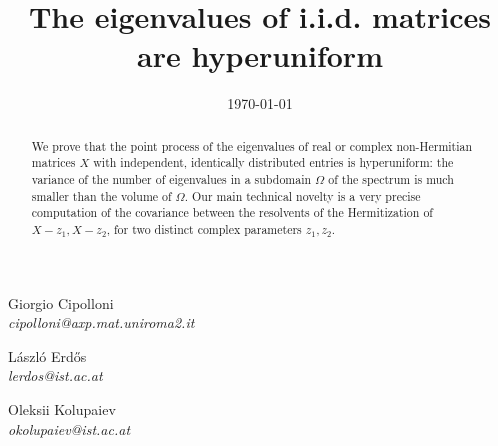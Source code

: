 \documentclass[10pt]{amsart}
\title[Hyperuniformity]{The eigenvalues of i.i.d. matrices are hyperuniform}
\date{\today}
\numberwithin{equation}{section}
\begin{document}
\maketitle

\vspace{0.25cm}

\renewcommand{\thefootnote}{\fnsymbol{footnote}}	


\noindent
\mbox{}%
\hfill%
\begin{minipage}{0.19\textwidth}
	\centering
	{Giorgio Cipolloni}\footnotemark[1]\\
	\footnotesize{\textit{cipolloni@axp.mat.uniroma2.it}}
\end{minipage}
\hfill%
\begin{minipage}{0.19\textwidth}
	\centering
	{L\'aszl\'o Erd\H{o}s}\footnotemark[2]\\
	\footnotesize{\textit{lerdos@ist.ac.at}}
\end{minipage}
\hfill%
\begin{minipage}{0.19\textwidth}
	\centering
	{Oleksii Kolupaiev}\footnotemark[2]\\
	\footnotesize{\textit{okolupaiev@ist.ac.at}}
\end{minipage}
\hfill%
\mbox{}%
%

\renewcommand*{\thefootnote}{\arabic{footnote}}
\vspace{0.25cm}


\begin{abstract} 
We prove that the point process of the eigenvalues of real or complex non-Hermitian matrices $X$ with independent, identically distributed entries is hyperuniform: the variance of the number of eigenvalues in a subdomain $\Omega$ of the spectrum is much smaller than the volume of $\Omega$. Our main technical novelty is a very precise computation of the covariance between the resolvents of the Hermitization of $X-z_1, X-z_2$, for two distinct complex parameters $z_1,z_2$.
\end{abstract}
\vspace{0.15cm}
\end{document}
